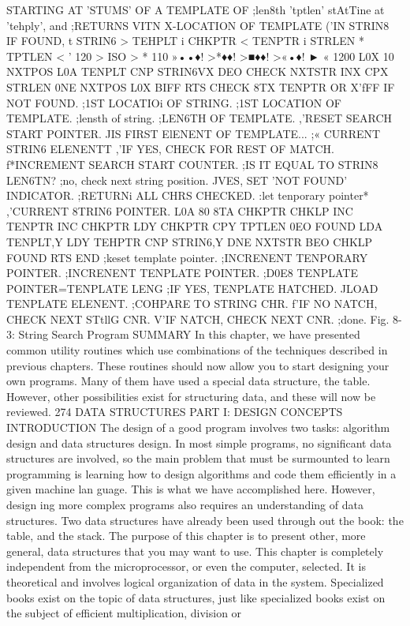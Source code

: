 {STARTING AT 'STUMS' OF A TEMPLATE OF
;len8th 'tptlen' stAtTine at 'tehply', and
;RETURNS VITN X-LOCATION OF TEMPLATE
('IN STRIN8 IF FOUND,
t
STRIN6 >
TEHPLT i
CHKPTR <
TENPTR i
STRLEN *
TPTLEN <
' 120
> ISO
> * 110
»••♦!
>*♦♦!
>■♦♦!
>«•♦!
► « 1200
L0X 10
NXTPOS L0A TENPLT
CNP STRIN6VX
DEO CHECK
NXTSTR INX
CPX STRLEN
0NE NXTPOS
L0X BIFF
RTS
CHECK 8TX TENPTR
OR X'fFF IF NOT FOUND.
;1ST LOCATIOi OF STRING.
;1ST LOCATION OF TEMPLATE.
;lensth of string.
;LEN6TH OF TEMPLATE.
,'RESET SEARCH START POINTER.
JIS FIRST ElENENT OF TEMPLATE...
;« CURRENT STRIN6 ELENENTT
,'IF YES, CHECK FOR REST OF MATCH.
f*INCREMENT SEARCH START COUNTER.
;IS IT EQUAL TO STRIN8 LEN6TN?
;no, check next string position.
JVES, SET 'NOT FOUND' INDICATOR.
;RETURNi ALL CHRS CHECKED.
:let tenporary pointer*
,'CURRENT 8TRIN6 POINTER.
L0A 80
8TA CHKPTR
CHKLP INC TENPTR
INC CHKPTR
LDY CHKPTR
CPY TPTLEN
0EO FOUND
LDA TENPLT,Y
LDY TEHPTR
CNP STRIN6,Y
DNE NXTSTR
BEO CHKLP
FOUND RTS
END
;keset template pointer.
;INCRENENT TENPORARY POINTER.
;INCRENENT TENPLATE POINTER.
;D0E8 TENPLATE POINTER=TENPLATE LENG
;IF YES, TENPLATE HATCHED.
JLOAD TENPLATE ELENENT.
;COHPARE TO STRING CHR.
f'IF NO NATCH, CHECK NEXT STtllG CNR.
V'IF NATCH, CHECK NEXT CNR.
;done.
Fig. 8-3: String Search Program
SUMMARY
In this chapter, we have presented common utility routines which use
combinations of the techniques described in previous chapters. These
routines should now allow you to start designing your own programs.
Many of them have used a special data structure, the table. However,
other possibilities exist for structuring data, and these will now be
reviewed.
274
DATA STRUCTURES
PART I: DESIGN CONCEPTS
INTRODUCTION
The design of a good program involves two tasks: algorithm
design and data structures design. In most simple programs, no
significant data structures are involved, so the main problem that
must be surmounted to learn programming is learning how to
design algorithms and code them efficiently in a given machine lan
guage. This is what we have accomplished here. However, design
ing more complex programs also requires an understanding of data
structures. Two data structures have already been used through
out the book: the table, and the stack. The purpose of this chapter
is to present other, more general, data structures that you may
want to use. This chapter is completely independent from the
microprocessor, or even the computer, selected. It is theoretical
and involves logical organization of data in the system. Specialized
books exist on the topic of data structures, just like specialized
books exist on the subject of efficient multiplication, division or
}
